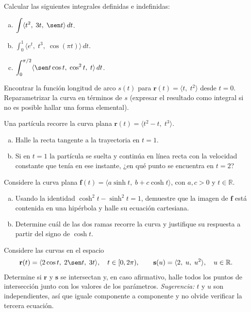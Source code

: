 \begin{prob}
Calcular las siguientes integrales definidas e indefinidas:
\begin{enumerate}[a)]
  \item $\displaystyle \int \langle t^2,\; 3t,\; \sen t \rangle\,dt$.
  \item $\displaystyle \int_0^1 \langle e^t,\; t^3,\; \cos(\pi t) \rangle\,dt$.
  \item $\displaystyle \int_0^{\pi/2} \langle \sen t \cos t,\; \cos^2 t,\; t \rangle\,dt$.
\end{enumerate}
\end{prob}



\begin{prob}
Encontrar la función longitud de arco $s(t)$ para $\mathbf{r}(t) = \langle t,\; t^2 \rangle$
desde $t=0$. Reparametrizar la curva en términos de $s$ (expresar el
resultado como integral si no es posible hallar una forma elemental).
\end{prob}

\begin{prob}
Una partícula recorre la curva plana $\mathbf{r}(t)=\langle t^2-t,\; t^3\rangle$.
\begin{enumerate}[a)]
  \item Halle la recta tangente a la trayectoria en $t=1$.
  \item Si en $t=1$ la partícula se suelta y continúa en línea recta con la
        velocidad constante que tenía en ese instante, ¿en qué punto se
        encuentra en $t=2$?
\end{enumerate}
\end{prob}

\begin{prob}
Considere la curva plana
$\mathbf{f}(t)=\langle a\sinh t,\; b+c\cosh t\rangle$, con $a,c>0$ y $t\in\mathbb{R}$.
\begin{enumerate}[a)]
  \item Usando la identidad $\cosh^2 t-\sinh^2 t=1$, demuestre que la imagen de
        $\mathbf{f}$ está contenida en una hipérbola y halle su ecuación
        cartesiana.
  \item Determine cuál de las dos ramas recorre la curva y justifique su
        respuesta a partir del signo de $\cosh t$.
\end{enumerate}
\end{prob}

\begin{prob}
Considere las curvas en el espacio
\[
  \mathbf{r}(t)=\langle 2\cos t,\; 2\sen t,\; 3t\rangle,\quad t\in[0,2\pi),
  \qquad
  \mathbf{s}(u)=\langle 2,\; u,\; u^2\rangle,\quad u\in\mathbb{R}.
\]
Determine si $\mathbf{r}$ y $\mathbf{s}$ se intersectan y, en caso afirmativo,
halle todos los puntos de intersección junto con los valores de los
parámetros. \emph{Sugerencia:} $t$ y $u$ son independientes, así que iguale
componente a componente y no olvide verificar la tercera ecuación.
\end{prob}

